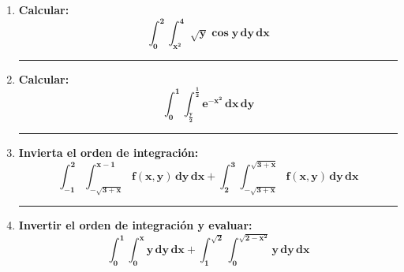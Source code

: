 \documentclass[12pt]{article}
\begin{document}
\begin{itemize}
\begin{enumerate}
                \hrule
                \item \textbf{Calcular:} \[\bm{\int_{0}^{2} \int_{x^2}^{4} \sqrt{y} \cos{y} \, dy \, dx}\]
                

                \hrule
                \item \textbf{Calcular:} \[\bm{\int_{0}^{1} \int_{\frac{y}{2}}^{\frac{1}{2}} e^{-x^2} \, dx \, dy}\]
                

                \hrule
                \item \textbf{Invierta el orden de integración:} \[\bm{\int_{-1}^{2} \int_{-\sqrt{3 + x}}^{x - 1} f(x, y) \, dy \, dx + \int_{2}^{3} \int_{-\sqrt{3 + x}}^{\sqrt{3 + x}} f(x, y) \, dy \, dx}\]
                

                \hrule
                \item \textbf{Invertir el orden de integración y evaluar:} \[\bm{\int_{0}^{1} \int_{0}^{x} y \, dy \, dx + \int_{1}^{\sqrt{2}} \int_{0}^{\sqrt{2 - x^2}} y \, dy \, dx}\]
                

            \end{enumerate}


    \end{itemize}
\end{document}

